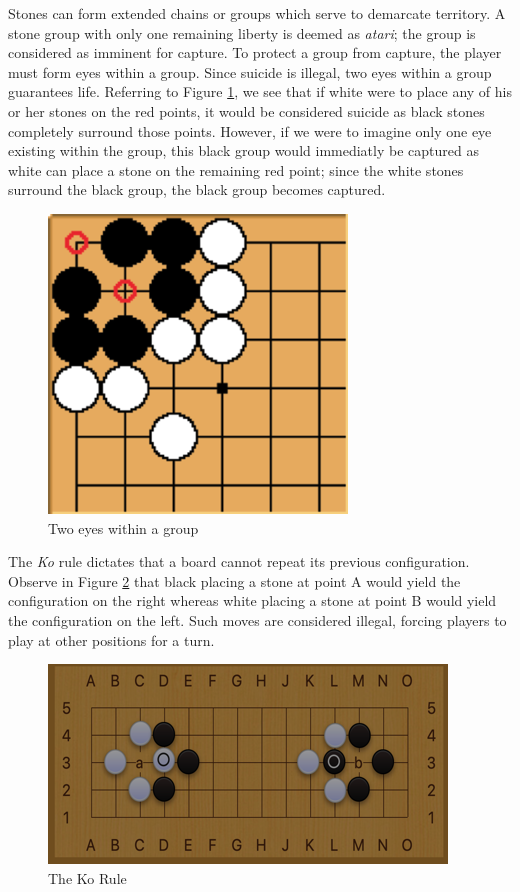 \documentclass[11pt]{article}
\begin{document}
Stones can form extended chains or groups which serve to demarcate territory. A stone group with only one remaining liberty is deemed as \textit{atari}; the group is considered as imminent for capture. To protect a group from capture, the player must form eyes within a group. Since suicide is illegal, two eyes within a group guarantees life. Referring to Figure \ref{fig:eyes1}, we see that if white were to place any of his or her stones on the red points, it would be considered suicide as black stones completely surround those points. However, if we were to imagine only one eye existing within the group, this black group would immediatly be captured as white can place a stone on the remaining red point; since the white stones surround the black group, the black group becomes captured.
\begin{figure}[ht]
  \centering
  \includegraphics[scale=0.75]{eyes1.png}
  \caption{Two eyes within a group}
  \label{fig:eyes1}
\end{figure}

The \textit{Ko} rule dictates that a board cannot repeat its previous configuration. Observe in Figure \ref{fig:ko1} that black placing a stone at point A would yield the configuration on the right whereas white placing a stone at point B would yield the configuration on the left. Such moves are considered illegal, forcing players to play at other positions for a turn.

\begin{figure}[ht]
  \centering
  \includegraphics[scale=0.75]{ko1.png}
  \caption{The Ko Rule}
  \label{fig:ko1}
\end{figure}
\end{document}
